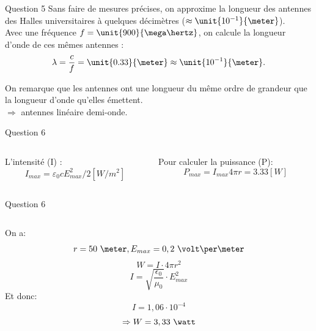 \documentclass{beamer}
\begin{document}
\begin{frame}{Question 5}
	    Sans faire de mesures précises, on approxime la longueur des antennes des Halles universitaires à quelques décimètres ($\approx \unit{10^{-1}}{\meter}$).\\[0.5em]
	    Avec une fréquence $f = \unit{900}{\mega\hertz}$, on calcule la longueur d'onde de ces mêmes antennes :
	    \[
	        \lambda = \frac{c}{f} = \unit{0.33}{\meter} \approx \unit{10^{-1}}{\meter}
	        \text.
	    \]
	    
	    On remarque que les antennes ont une longueur du même ordre de grandeur que la longueur d'onde qu'elles émettent.\\[0.5em]
	    
	    $\Rightarrow$ antennes linéaire demi-onde.
\end{frame}


\begin{frame}{Question 6}
	\begin{columns}
		\begin{column}{0.40\textwidth}
			\begin{center}
			L'intensité (I)  : 
			$$I_{max} = \varepsilon_0 c E_{max}^2/2 [W/m^2] $$
	    		
        		\end{center}
        	\end{column}
        	\begin{column}{0.40\textwidth}
			\begin{center}
	    Pour calculer la puissance (P):
	    $$ P_{max} = I_{max}4\pi r = 3.33 [W] $$
	    
        	\end{center}
        	\end{column}
        	\end{columns}
\end{frame}

\begin{frame}{Question 6}
	\begin{columns}
		\begin{column}{0.70\textwidth}
	    		On a:
			$$r = 50\ \meter, E_{max} = 0,2\ \volt\per\meter$$
			$$W = I \cdot 4\pi r^2$$
			$$I = \sqrt{\frac{\epsilon_0}{\mu_0}}\cdot E_{max}^2$$
			Et donc:
			$$I= 1,06\cdot10^{-4}$$
			$$\Rightarrow W = 3,33\ \watt$$
		
        		\end{column}
        	\end{columns}
\end{frame}
\end{document}
